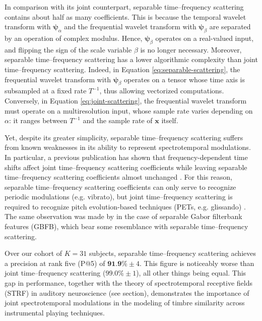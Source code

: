 \documentclass{bmcart}
\newcommand{\lnameref}[1]{%
\bgroup
\let\nmu\MakeLowercase
\nameref{#1}\egroup}
\newcommand{\nmu}{}
\begin{document}
In comparison with its joint counterpart, separable time--frequency scattering contains about half as many coefficients.
This is because the temporal wavelet transform with $\boldsymbol{\psi}_\alpha$ and the frequential wavelet transform with $\boldsymbol{\psi}_\beta$ are separated by an operation of complex modulus.
Hence, $\boldsymbol{\psi}_\beta$ operates on a real-valued input, and flipping the sign of the scale variable $\beta$ is no longer necessary.
Moreover, separable time--frequency scattering has a lower algorithmic complexity than joint time--frequency scattering.
Indeed, in Equation \ref{eq:separable-scattering}, the frequential wavelet transform with $\boldsymbol{\psi}_{\beta}$ operates on a tensor whose time axis is subsampled at a fixed rate $T^{-1}$, thus allowing vectorized computations.
Conversely, in Equation \ref{eq:joint-scattering}, the frequential wavelet transform must operate on a multiresolution input, whose sample rate varies  depending on $\alpha$: it ranges between $T^{-1}$ and the sample rate of $\boldsymbol{x}$ itself.

Yet, despite its greater simplicity, separable time--frequency scattering suffers from known weaknesses in its ability to represent spectrotemporal modulations.
In particular, a previous publication has shown that frequency-dependent time shifts affect joint time--frequency scattering coefficients while leaving separable time--frequency scattering coefficients almost unchanged \cite{anden2019tsp}.
For this reason, separable time--frequency scattering coefficients can only serve to recognize periodic modulations (e.g. vibrato), but joint time--frequency scattering is required to recognize pitch evolution-based techniques (PETs, e.g. glissando) \cite{wang2020icassp}.
The same observation was made by \cite{schadler2015jasa} in the case of separable Gabor filterbank features (GBFB), which bear some resemblance with separable time--frequency scattering.

Over our cohort of $K=31$ subjects, separable time--frequency scattering achieves a precision at rank five (P@5) of $\textbf{91.9\%} \pm 4$. This figure is noticeably worse than joint time--frequency scattering ($99.0\% \pm 1$), all other things being equal.
This gap in performance, together with the theory of spectrotemporal receptive fields (STRF) in auditory neuroscience (see \lnameref{sec:soa} section), demonstrates the importance of joint spectrotemporal modulations in the modeling of timbre similarity across instrumental playing techniques.
\end{document}
